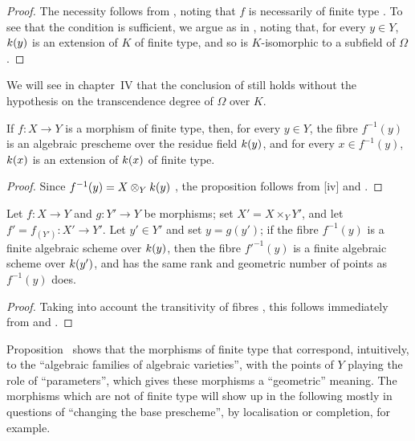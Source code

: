 \begin{proof}
The necessity follows from , noting that $f$ is necessarily of finite type .
To see that the condition is sufficient, we argue as in , noting that, for every $y\in Y$, $k(y)$ is an extension of $K$ of finite type, and so is $K$-isomorphic to a subfield of $\Omega$.
\end{proof}

\begin{remark}[6.4.10]
\label{I.6.4.10}
We will see in chapter~IV that the conclusion of  still holds without the hypothesis on the transcendence degree of $\Omega$ over $K$.
\end{remark}

\begin{proposition}[6.4.11]
\label{I.6.4.11}
If $f:X\to Y$ is a morphism of finite type, then, for every $y\in Y$, the fibre $f^{-1}(y)$ is an algebraic prescheme over the residue field $k(y)$, and for every $x\in f^{-1}(y)$, $k(x)$ is an extension of $k(x)$ of finite type.
\end{proposition}

\begin{proof}
Since $f^{-1}(y)=X\otimes_Yk(y)$ , the proposition follows from [iv] and .
\end{proof}

\begin{proposition}[6.4.12]
\label{I.6.4.12}
Let $f:X\to Y$ and $g:Y'\to Y$ be morphisms;
set $X'=X\times_Y Y'$, and let $f'=f_{(Y')}:X'\to Y'$.
Let $y'\in Y'$ and set $y=g(y')$;
if the fibre $f^{-1}(y)$ is a finite algebraic scheme over $k(y)$, then the fibre $f'^{-1}(y)$ is a finite algebraic scheme over $k(y')$, and has the same rank and geometric number of points as $f^{-1}(y)$ does.
\end{proposition}

\begin{proof}
Taking into account the transitivity of fibres , this follows immediately from  and .
\end{proof}

\begin{env}[6.4.13]
\label{I.6.4.13}
Proposition~ shows that the morphisms of finite type that correspond, intuitively, to the ``algebraic families of algebraic varieties'', with the points of $Y$ playing the
role of ``parameters'', which gives these morphisms a ``geometric'' meaning.
The morphisms which are not of finite type will show up in the following mostly in questions of ``changing the base prescheme'', by localisation or completion, for example.
\end{env}


